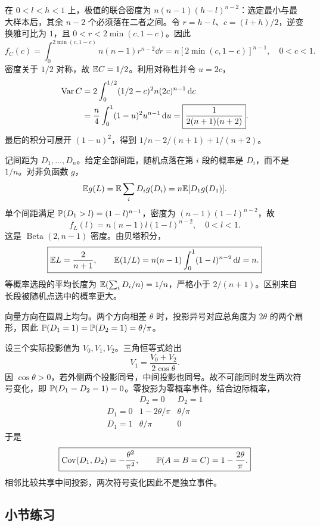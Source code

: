 在 $0<l<h<1$ 上，极值的联合密度为 $n(n-1)(h-l)^{n-2}$：选定最小与最大样本后，其余 $n-2$ 个必须落在二者之间。令 $r=h-l$、$c=(l+h)/2$，逆变换雅可比为 $1$，且 $0<r<2\min(c,1-c)$。因此
\[
\boxed{f_C(c)=\int_0^{2\min(c,1-c)}n(n-1)r^{n-2}\dd r
=n[2\min(c,1-c)]^{n-1},\quad0<c<1.}
\]
密度关于 $1/2$ 对称，故 $\mathbb{E} C=1/2$。利用对称性并令 $u=2c$，
\[
\begin{aligned}
\operatorname{Var} C&=2\int_0^{1/2}(1/2-c)^2n(2c)^{n-1}\,\mathrm{d} c\\
&=\frac n4\int_0^1(1-u)^2u^{n-1}\,\mathrm{d} u
=\boxed{\frac1{2(n+1)(n+2)}}.
\end{aligned}
\]
最后的积分可展开 $(1-u)^2$，得到 $1/n-2/(n+1)+1/(n+2)$。

记间距为 $D_1,\ldots,D_n$。给定全部间距，随机点落在第 $i$ 段的概率是 $D_i$，而不是 $1/n$。对非负函数 $g$，
\[
\mathbb{E} g(L)=\mathbb{E}\sum_iD_i g(D_i)=n\mathbb{E}[D_1g(D_1)].
\]
单个间距满足 $\mathbb{P}(D_1>l)=(1-l)^{n-1}$，密度为 $(n-1)(1-l)^{n-2}$，故
\[
\boxed{f_L(l)=n(n-1)l(1-l)^{n-2},\quad0<l<1.}
\]
这是 $\operatorname{Beta}(2,n-1)$ 密度。由贝塔积分，
\[
\boxed{\mathbb{E} L=\frac2{n+1},\qquad
\mathbb{E}(1/L)=n(n-1)\int_0^1(1-l)^{n-2}\,\mathrm{d} l=n.}
\]
等概率选段的平均长度为 $\mathbb{E}(\sum_iD_i/n)=1/n$，严格小于 $2/(n+1)$。区别来自长段被随机点选中的概率更大。

向量方向在圆周上均匀。两个方向相差 $\theta$ 时，投影异号对应总角度为 $2\theta$ 的两个扇形，因此 $\mathbb{P}(D_1=1)=\mathbb{P}(D_2=1)=\theta/\pi$。

设三个实际投影值为 $V_0,V_1,V_2$。三角恒等式给出
\[
V_1=\frac{V_0+V_2}{2\cos\theta}.
\]
因 $\cos\theta>0$，若外侧两个投影同号，中间投影也同号。故不可能同时发生两次符号变化，即 $\mathbb{P}(D_1=D_2=1)=0$。零投影为零概率事件。结合边际概率，
\[
\boxed{\begin{array}{c|cc}
& D_2=0&D_2=1\\ \hline
D_1=0&1-2\theta/\pi&\theta/\pi\\
D_1=1&\theta/\pi&0
\end{array}}
\]
于是
\[
\boxed{\operatorname{Cov}(D_1,D_2)=-\frac{\theta^2}{\pi^2},\qquad
\mathbb{P}(A=B=C)=1-\frac{2\theta}{\pi}.}
\]
相邻比较共享中间投影，两次符号变化因此不是独立事件。

\par{}
\subsection*{小节练习}










